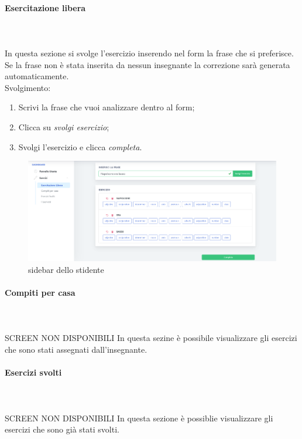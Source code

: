         \paragraph{Esercitazione libera}\mbox{}\\ \\
        In questa sezione si svolge l'esercizio inserendo nel form la frase che 
        si preferisce. Se la frase non è stata inserita da nessun insegnante la 
        correzione sarà generata automaticamente.
       \\ Svolgimento:
        \begin{enumerate}
        
            \item Scrivi la frase che vuoi analizzare dentro al form;
            \item Clicca su \textit{svolgi esercizio};
            \item Svolgi l'esercizio e clicca \textit{completa}.
        \end{enumerate}
        \begin{figure}[H]
                \centering
                \includegraphics[width=17cm]{sez/img/studente/EsercitazioneLiberaEsegui.png} 
                \caption{sidebar dello stidente}\label{fig:1}
        \end{figure}
        \newpage
        \paragraph{Compiti per casa}\mbox{}\\ \\
        SCREEN NON DISPONIBILI
        In questa sezine è possibile visualizzare gli esercizi che sono
        stati assegnati dall'insegnante.
        \paragraph{Esercizi svolti}\mbox{}\\ \\
        SCREEN NON DISPONIBILI
        In questa sezione è possiblie visualizzare gli esercizi che sono
        già stati svolti.
